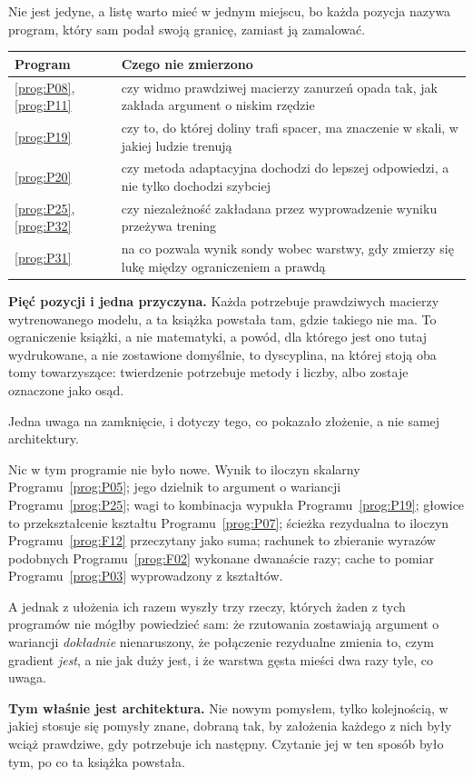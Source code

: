 \begin{fr}
Nie jest jedyne, a listę warto mieć w jednym miejscu, bo każda pozycja nazywa
program, który sam podał swoją granicę, zamiast ją zamalować.

\begin{center}
\begin{tabularx}{\linewidth}{lX}
\toprule
Program & Czego nie zmierzono \\
\midrule
\ref{prog:P08}, \ref{prog:P11} & czy widmo prawdziwej macierzy zanurzeń opada
  tak, jak zakłada argument o niskim rzędzie \\
\ref{prog:P19} & czy to, do której doliny trafi spacer, ma znaczenie w skali,
  w jakiej ludzie trenują \\
\ref{prog:P20} & czy metoda adaptacyjna dochodzi do lepszej odpowiedzi, a nie
  tylko dochodzi szybciej \\
\ref{prog:P25}, \ref{prog:P32} & czy niezależność zakładana przez
  wyprowadzenie wyniku przeżywa trening \\
\ref{prog:P31} & na co pozwala wynik sondy wobec warstwy, gdy zmierzy się
  lukę między ograniczeniem a prawdą \\
\bottomrule
\end{tabularx}
\end{center}

\textbf{Pięć pozycji i jedna przyczyna.} Każda potrzebuje prawdziwych macierzy
wytrenowanego modelu, a ta książka powstała tam, gdzie takiego nie ma. To
ograniczenie książki, a nie matematyki, a powód, dla którego jest ono tutaj
wydrukowane, a nie zostawione domyślnie, to dyscyplina, na której stoją oba
tomy towarzyszące: twierdzenie potrzebuje metody i liczby, albo zostaje
oznaczone jako osąd.
\end{fr}

\begin{fr}
Jedna uwaga na zamknięcie, i dotyczy tego, co pokazało złożenie, a nie samej
architektury.

Nic w tym programie nie było nowe. Wynik to iloczyn skalarny
Programu~\ref{prog:P05}; jego dzielnik to argument o wariancji
Programu~\ref{prog:P25}; wagi to kombinacja wypukła Programu~\ref{prog:P19};
głowice to przekształcenie kształtu Programu~\ref{prog:P07}; ścieżka
rezydualna to iloczyn Programu~\ref{prog:F12} przeczytany jako suma; rachunek
to zbieranie wyrazów podobnych Programu~\ref{prog:F02} wykonane dwanaście
razy; cache to pomiar Programu~\ref{prog:P03} wyprowadzony z kształtów.

A jednak z ułożenia ich razem wyszły trzy rzeczy, których żaden z tych
programów nie mógłby powiedzieć sam: że rzutowania zostawiają argument o
wariancji \emph{dokładnie} nienaruszony, że połączenie rezydualne zmienia to,
czym gradient \emph{jest}, a nie jak duży jest, i że warstwa gęsta mieści dwa
razy tyle, co uwaga.

\textbf{Tym właśnie jest architektura.} Nie nowym pomysłem, tylko kolejnością,
w jakiej stosuje się pomysły znane, dobraną tak, by założenia każdego z nich
były wciąż prawdziwe, gdy potrzebuje ich następny. Czytanie jej w ten sposób
było tym, po co ta książka powstała.
\end{fr}


